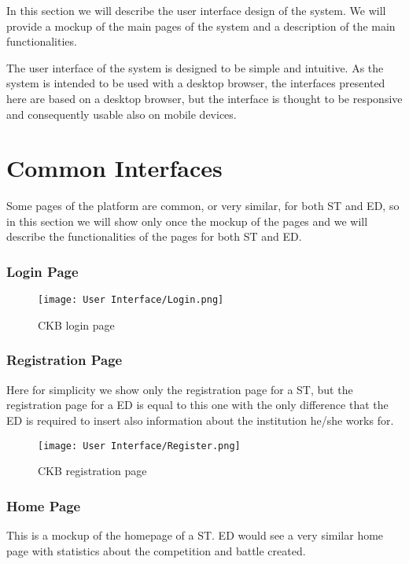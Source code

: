 %
In this section we will describe the user interface design of the system. We will provide a mockup of the main pages of the system and a description of the main functionalities.

The user interface of the system is designed to be simple and intuitive. As the system is intended to be used with a desktop browser, the interfaces presented here are based on a desktop browser, but the interface is thought to be responsive and consequently usable also on mobile devices.

\section*{Common Interfaces}
\label{s:common_interface}%
Some pages of the platform are common, or very similar, for both ST and ED, so in this section we will show only once the mockup of the pages and we will describe the functionalities of the pages for both ST and ED.

\subsubsection*{Login Page}
\label{ss:login}%

\begin{figure}[H]
  \centering
  \texttt{[image: User Interface/Login.png]}
  \caption{CKB login page}
  \label{fig:login}
\end{figure}

\newpage

\subsubsection*{Registration Page}
\label{ss:registration}%
Here for simplicity we show only the registration page for a ST, but the registration page for a ED is equal to this one with the only difference that the ED is required to insert also information about the institution he/she works for.

\begin{figure}[H]
  \centering
  \texttt{[image: User Interface/Register.png]}
  \caption{CKB registration page}
  \label{fig:registration}
\end{figure}

\newpage

\subsubsection*{Home Page}
\label{ss:home_page}%
This is a mockup of the homepage of a ST. ED would see a very similar home page with statistics about the competition and battle created.


